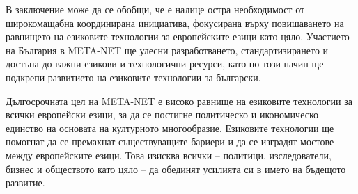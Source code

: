 \begin{multicols}{2}
  В заключение може да се обобщи, че е налице остра необходимост от
  широкомащабна координирана инициатива, фокусирана върху повишаването
  на равнището на езиковите технологии за европейските езици като цяло.
  Участието на България в META-NET ще улесни разработването,
  стандартизирането и достъпа до важни езикови и технологични ресурси,
  като по този начин ще подкрепи развитието на езиковите технологии за
  български.

  Дългосрочната цел на META-NET е високо равнище на езиковите технологии
  за всички европейски езици, за да се постигне политическо и
  икономическо единство на основата на културното
  многообразие. Езиковите технологии ще помогнат да се премахнат
  съществуващите бариери и да се изградят мостове между европейските
  езици. Това изисква всички -- политици, изследователи, бизнес и
  обществото като цяло -- да обединят усилията си в името на бъдещото
  развитие.
  \end{multicols}

  \clearpage

